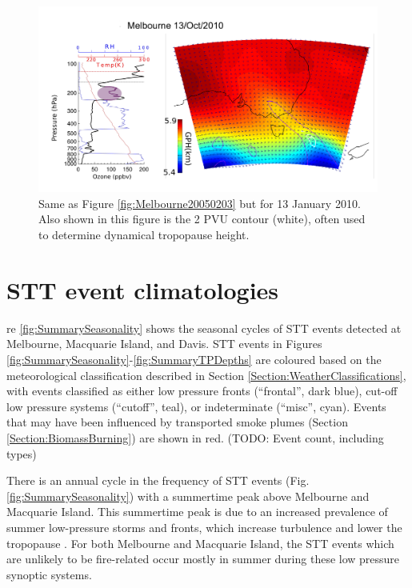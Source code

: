 \documentclass{article}
\begin{document}
    \begin{figure}[!htbp]
      \begin{center}
      \includegraphics[width=1.0\columnwidth]{figures/Melbourne20100113.png}
      \caption{Same as Figure \ref{fig:Melbourne20050203} but for 13 January 2010.
	Also shown in this figure is the 2 PVU contour (white), often used to determine dynamical tropopause height.}
      \label{fig:Melbourne20100113}
      \end{center}
    \end{figure}

\section{STT event climatologies}
  
  re \ref{fig:SummarySeasonality} shows the seasonal cycles of STT events detected at Melbourne, Macquarie Island, and Davis. 
  STT events in Figures \ref{fig:SummarySeasonality}-\ref{fig:SummaryTPDepths} are coloured based on the meteorological classification described in Section \ref{Section:WeatherClassifications}, with events classified as either low pressure fronts (“frontal”, dark blue), cut-off low pressure systems (“cutoff”, teal), or indeterminate (“misc”, cyan).
  Events that may have been influenced by transported smoke plumes (Section \ref{Section:BiomassBurning}) are shown in red.
  (TODO: Event count, including types)
  
  There is an annual cycle in the frequency of STT events  (Fig. \ref{fig:SummarySeasonality}) with a summertime peak above Melbourne and Macquarie Island.
  This summertime peak is due to an increased prevalence of summer low-pressure storms and fronts, which increase turbulence and lower the tropopause \citep{Reutter2015}.
  For both Melbourne and Macquarie Island, the STT events which are unlikely to be fire-related occur mostly in summer during these low pressure synoptic systems.
\end{document}
